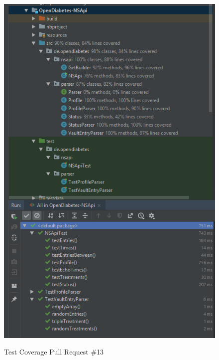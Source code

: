 \documentclass[accentcolor=tud0b,12pt,paper=a4]{tudreport}
\begin{document}
\begin{figure}[h]
\centering
\caption{Test Coverage Pull Request \#13}
\includegraphics[width=\textwidth,height=\textheight,keepaspectratio]{pr-cov-13}
\label{pr-cov:13}
\end{figure}
\end{document}
